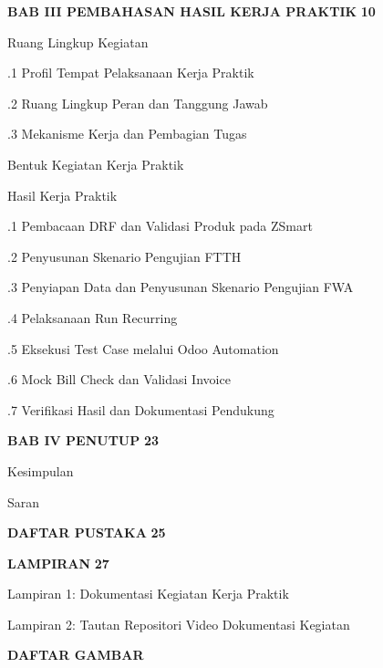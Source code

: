 \documentclass[12pt,a4paper]{article}
\begin{document}
\begin{singlespace}
\vspace{0.2cm}
\noindent\textbf{BAB III PEMBAHASAN HASIL KERJA PRAKTIK} \dotfill \textbf{10}\par
{} Ruang Lingkup Kegiatan \par
\noindent {}.1 Profil Tempat Pelaksanaan Kerja Praktik \par
\noindent {}.2 Ruang Lingkup Peran dan Tanggung Jawab \par
\noindent {}.3 Mekanisme Kerja dan Pembagian Tugas \par
{} Bentuk Kegiatan Kerja Praktik \par
{} Hasil Kerja Praktik \par
\noindent {}.1 Pembacaan DRF dan Validasi Produk pada ZSmart \par
\noindent {}.2 Penyusunan Skenario Pengujian FTTH \par
\noindent {}.3 Penyiapan Data dan Penyusunan Skenario Pengujian FWA \par
\noindent {}.4 Pelaksanaan Run Recurring \par
\noindent {}.5 Eksekusi Test Case melalui Odoo Automation \par
\noindent {}.6 Mock Bill Check dan Validasi Invoice \par
\noindent {}.7 Verifikasi Hasil dan Dokumentasi Pendukung \par
\vspace{0.2cm}
\noindent\textbf{BAB IV PENUTUP} \dotfill \textbf{23}\par
{} Kesimpulan \par
{} Saran \par
\vspace{0.2cm}
\noindent\textbf{DAFTAR PUSTAKA} \dotfill \textbf{25}\par
\noindent\textbf{LAMPIRAN} \dotfill \textbf{27}\par
\noindent \quad Lampiran 1: Dokumentasi Kegiatan Kerja Praktik \par
\noindent \quad Lampiran 2: Tautan Repositori Video Dokumentasi Kegiatan \par
\end{singlespace}

\clearpage
\begin{center}
    {\bfseries\large DAFTAR GAMBAR\par}
\end{center}
\vspace{0.3cm}
\end{document}

